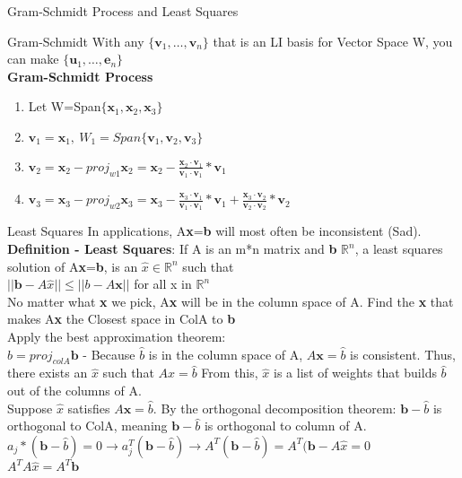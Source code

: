 \documentclass[a4paper, 12pt]{article}
\begin{document}
\begin{section}{Gram-Schmidt Process and Least Squares}
\begin{subsection}
\end{subsection}
\begin{subsection}{Gram-Schmidt}
With any $\{\textbf{v}_{1},\dots,\textbf{v}_{n}\}$ that is an LI basis for 
Vector Space W, you can make $\{\textbf{u}_{1},\dots,\textbf{e}_{n}\}$ \\
\textbf{Gram-Schmidt Process}
\begin{enumerate}
\item{Let W=Span$\{\textbf{x}_{1}, \textbf{x}_{2}, \textbf{x}_{3}\}$}
\item{$\textbf{v}_{1}=\textbf{x}_{1},~W_1=Span\{\textbf{v}_{1}
	,\textbf{v}_{2},\textbf{v}_{3}\}$}
\item{$\textbf{v}_{2}=\textbf{x}_{2}-proj_{w1}\textbf{x}_{2}=\textbf{x
}_{2}-\frac{\textbf{x}_{2}\cdot\textbf{v}_{1}}{\textbf{v}_{1}\cdot
\textbf{v}_{1}}*\textbf{v}_{1}$}
\item{$\textbf{v}_{3}=\textbf{x}_{3}-proj_{w2}\textbf{x}_{3}=\textbf{x
}_{3}-\frac{\textbf{x}_{3}\cdot\textbf{v}_{1}}{\textbf{v}_{1}\cdot
\textbf{v}_{1}}*\textbf{v}_{1}+\frac{\textbf{x}_{3}\cdot\textbf{v}_{2}}
{\textbf{v}_{2}\cdot\textbf{v}_{2}}*\textbf{v}_{2}$}
\end{enumerate}
\end{subsection}
\begin{subsection}{Least Squares}
In applications, A\textbf{x}=\textbf{b} will most often be inconsistent (Sad). \\
\textbf{Definition - Least Squares}: If A is an m*n matrix and \textbf{b}
$\mathbb{R}^{n}$, a least squares solution of A\textbf{x}=\textbf{b}, is an 
$\hat{x} \in \mathbb{R}^{n}$ such that \\
$||\textbf{b}-A\hat{x}|| \leq ||b-A\textbf{x}||$ for all x in $\mathbb{R}^{n}$ \\
No matter what \textbf{x} we pick, A\textbf{x} will be in the column space of A.
Find the \textbf{x} that makes A\textbf{x} the Closest space in ColA to \textbf{b}
\\ Apply the best approximation theorem:\\
$\hat{b}=proj_{colA}\textbf{b}$ - Because $\hat{b}$ is in the column space of A,
$A\textbf{x}=\hat{b}$ is consistent. Thus, there exists an $\hat{x}$ such that 
$A\hat{x}=\hat{b}$ From this, $\hat{x}$ is a list of weights that builds $\hat{b}$
out of the columns of A. \\
Suppose $\hat{x}$ satisfies $A\textbf{x}=\hat{b}$. By the orthogonal decomposition
theorem: $\textbf{b}-\hat{b}$ is orthogonal to ColA, meaning $\textbf{b}-\hat{b}$ 
is orthogonal to column of A. \\
$a_{j}*(\textbf{b}-\hat{b})=0 \to a_{j}^{T}(\textbf{b}-\hat{b}) \to A^{T}
(\textbf{b}-\hat{b}) = A^{T}(\textbf{b}-A\hat{x}=0$\\
$A^{T}A\hat{x}=A^{T}\textbf{b}$
\end{subsection}
\end{section}
\end{document}
